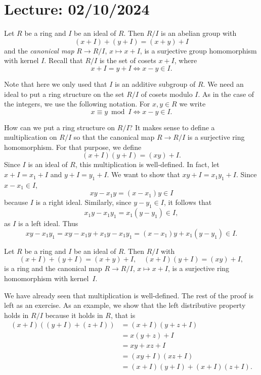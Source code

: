 \section{Lecture: 02/10/2024}

Let $R$ be a ring and $I$ be an ideal of $R$. 
Then $R/I$ is an abelian group
with 
\[
(x+I)+(y+I)=(x+y)+I
\]
and the 
\emph{canonical map} 
$R\to R/I$, $x\mapsto x+I$,
is a surjective group homomorphism with kernel $I$. Recall that 
$R/I$ is the set of cosets $x+I$, where 
\[
x+I=y+I\Longleftrightarrow x-y\in I.
\]

Note that here we only used
that $I$ is an additive subgroup of $R$. We need an ideal to put a ring structure
on the set $R/I$ of cosets modulo $I$. As in the case of the integers, 
we use the following notation. For $x,y\in R$ 
we write 
\[
x\equiv y\bmod I\Longleftrightarrow x-y\in I.
\]

How can we put a ring structure on $R/I$? It makes sense
to define a multiplication on $R/I$ so that
the canonical map $R\to R/I$ is a surjective ring homomorphism. For that purpose, 
we define 
\[
(x+I)(y+I)=(xy)+I.
\]
Since $I$ is an ideal of $R$, this multiplication is well-defined. In fact, let 
$x+I=x_1+I$ and $y+I=y_1+I$. We want to show that
$xy+I=x_1y_1+I$. Since $x-x_1\in I$, 
\[
xy-x_1y=(x-x_1)y\in I
\]
because $I$ is a right ideal. Similarly, since $y-y_1\in I$, it follows that 
\[
x_1y-x_1y_1=x_1(y-y_1)\in I,
\]
as $I$ is a left ideal. Thus
\[
xy-x_1y_1=xy-x_1y+x_1y-x_1y_1=(x-x_1)y+x_1(y-y_1)\in I.
\]

\begin{theorem}
\label{thm:quotient_ring}
	Let $R$ be a ring and $I$ be an ideal of $R$. Then
	$R/I$ with 
	\[
	(x+I)+(y+I)=(x+y)+I,\quad
	(x+I)(y+I)=(xy)+I,
	\]
	is a ring and the canonical map $R\to R/I$, $x\mapsto x+I$, 
	is a surjective ring homomorphism with kernel~$I$. 
\end{theorem}

We have already seen that multiplication is well-defined. 
The rest of the proof is left as an exercise. As an example, we show that 
the left distributive property holds
in $R/I$ because it holds in $R$, that is 
\begin{align*}
    (x+I)\left((y+I)+(z+I)\right) &= (x+I)(y+z+I)\\
    &=x(y+z)+I\\
    &=xy+xz+I\\
    &=(xy+I)(xz+I)\\
    &=(x+I)(y+I)+(x+I)(z+I).
\end{align*}

